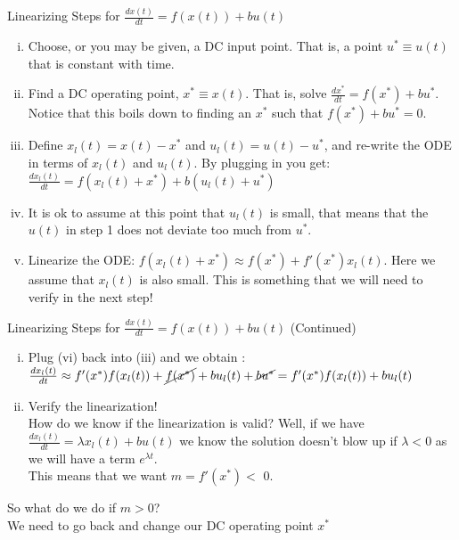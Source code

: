 \documentclass{beamer}
\begin{document}
	\begin{frame}{Linearizing Steps for $\frac{dx(t)}{dt} = f(x(t)) + bu(t)$}
	\begin{enumerate}[(i)]
	    \item Choose, or you may be given, a DC input point. That is, a point $u^* \equiv u(t)$ that is constant with time.\pause \\
	    \item Find a DC operating point, $x^* \equiv x(t)$. That is, solve $\frac{dx^*}{dt} = f(x^*) + bu^*$. Notice that this boils down to finding an $x^*$ such that $f(x^*) + bu^* = 0 $. \pause \\
	    \item Define $x_l(t) = x(t) - x^*$ and $u_l(t) = u(t) - u^*$, and re-write the ODE in terms of $ x_l(t)$ and $ u_l(t)$. By plugging in you get: $\frac{dx_l(t)}{dt} = f(x_l(t) + x^*) + b(u_l(t)+ u^*)$ \pause \\
	    \item It is ok to assume at this point that $u_l(t)$ is small, that means that the $u(t)$ in step 1 does not deviate too much from $u^*$.\pause \\
	    \item Linearize the ODE: $f(x_l(t) + x^*) \approx f(x^*) + f'(x^*)x_l(t)$. Here we assume that $x_l(t)$ is also small. This is something that we will need to verify in the next step!
	\end{enumerate}
	 \end{frame}
	 \begin{frame}{Linearizing Steps for $\frac{dx(t)}{dt} = f(x(t)) + bu(t)$ (Continued)}
	     \begin{enumerate}[(vi)]
	         \item Plug (vi) back into  (iii) and we obtain : $\frac{dx_l(t)}{dt} \approx f'(x^*)f(x_l(t)) + \cancel{f(x^*)} + bu_l(t)+ \cancel{bu^*} = f'(x^*)f(x_l(t))+ bu_l(t)$
	         \item Verify the linearization! \\
	         How do we know if the linearization is valid? \pause Well, if we have $\frac{dx_l(t)}{dt} = \lambda x_l(t) + bu(t)$ we know the solution doesn't blow up if $\lambda < 0$ as we will have a term $e^{\lambda t}$.
	         \\ This means that we want $m = f'(x^*) <$  0. 
	     \end{enumerate} \pause
	     So what do we do if $m>0 $? \pause \\
	     We need to go back and change our DC operating point $x^*$
	\end{frame}
\end{document}
